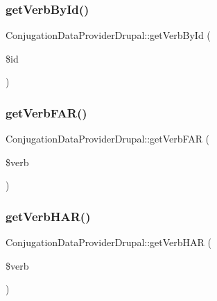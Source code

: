 \hypertarget{class_conjugation_data_provider_drupal_a1bc248d3d9e09762e4523ca230cdfdf4}{}\label{class_conjugation_data_provider_drupal_a1bc248d3d9e09762e4523ca230cdfdf4} 
\subsubsection{\texorpdfstring{get\+Verb\+By\+Id()}{getVerbById()}}
{\footnotesize\ttfamily Conjugation\+Data\+Provider\+Drupal\+::get\+Verb\+By\+Id (\begin{DoxyParamCaption}\item[{}]{\$id }\end{DoxyParamCaption})}

\hypertarget{class_conjugation_data_provider_drupal_a892823740ce22d263f1cf8c9f8447f71}{}\label{class_conjugation_data_provider_drupal_a892823740ce22d263f1cf8c9f8447f71} 
\subsubsection{\texorpdfstring{get\+Verb\+F\+A\+R()}{getVerbFAR()}}
{\footnotesize\ttfamily Conjugation\+Data\+Provider\+Drupal\+::get\+Verb\+F\+AR (\begin{DoxyParamCaption}\item[{}]{\$verb }\end{DoxyParamCaption})}

\hypertarget{class_conjugation_data_provider_drupal_ab60b9d6d1ed760ea68943419c176e997}{}\label{class_conjugation_data_provider_drupal_ab60b9d6d1ed760ea68943419c176e997} 
\subsubsection{\texorpdfstring{get\+Verb\+H\+A\+R()}{getVerbHAR()}}
{\footnotesize\ttfamily Conjugation\+Data\+Provider\+Drupal\+::get\+Verb\+H\+AR (\begin{DoxyParamCaption}\item[{}]{\$verb }\end{DoxyParamCaption})}

